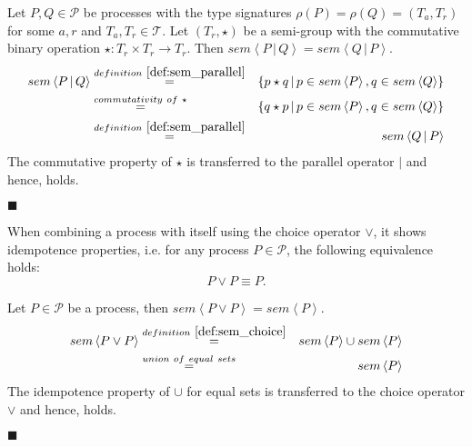 \begin{myproof}
Let $P, Q \in \mathcal{P}$ be processes with the type signatures $\rho \left( P \right) = \rho \left( Q \right) = \left( T_a, T_r \right)$ for some $a, r$ and $T_a, T_r \in \mathcal{T}$. Let $\left( T_r, \star \right)$ be a semi-group with the commutative binary operation $\star \colon T_r \times T_r \to T_r$. Then $sem \left\langle P \,|\, Q \right\rangle = sem \left\langle Q \,|\, P \right\rangle$.
\begin{eqnarray*}
  sem \left\langle P \,|\, Q \right\rangle & \overset{\defref{def:sem_parallel}}{=} & \left\{ p \star q \,|\, p \in sem \left\langle P \right\rangle, q \in sem \left\langle Q \right\rangle \right\} \\
  & \overset{commutativity \ of \ \star}{=} & \left\{ q \star p \,|\, p \in sem \left\langle P \right\rangle, q \in sem \left\langle Q \right\rangle \right\} \\
  & \overset{\defref{def:sem_parallel}}{=} & sem \left\langle Q \,|\, P \right\rangle
\end{eqnarray*}
The commutative property of $\star$ is transferred to the parallel operator $|$ and hence,  holds.

\hfill$\blacksquare$
\end{myproof}

\begin{theorem}
\label{thm:idempotence_choice}
When combining a process with itself using the choice operator $\vee$, it shows idempotence properties, i.e. for any process $P \in \mathcal{P}$, the following equivalence holds:
\begin{equation*}
  P \vee P \equiv P.
\end{equation*}
\end{theorem}

\begin{myproof}
Let $P \in \mathcal{P}$ be a process, then $sem \left\langle P \vee P \right\rangle = sem \left\langle P \right\rangle$.
\begin{eqnarray*}
  sem \left\langle P \vee P \right\rangle & \overset{\defref{def:sem_choice}}{=} & sem \left\langle P \right\rangle \cup sem \left\langle P \right\rangle \\
  & \overset{union\ of\ equal\ sets}{=} & sem \left\langle P \right\rangle
\end{eqnarray*}
The idempotence property of $\cup$ for equal sets is transferred to the choice operator $\vee$ and hence,  holds.

\hfill$\blacksquare$
\end{myproof}

